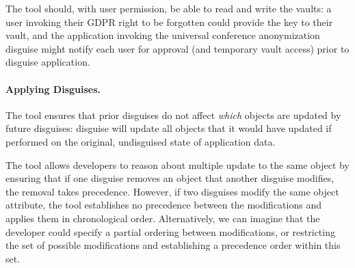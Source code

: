 The tool should, with user permission, be able to read and write the vaults: a user invoking their
GDPR right to be forgotten could provide the key to their vault, and the application invoking the
universal conference anonymization disguise might notify each user for approval (and temporary vault
access) prior to disguise application.  

\paragraph{Applying Disguises.}
The tool ensures that prior disguises do not affect \emph{which} objects are updated by future
disguises: disguise will update all objects that it would have updated if performed on the original,
undisguised state of application data. 

The tool allows developers to reason about multiple update to the same object by ensuring that 
if one disguise removes an object that another disguise modifies, the removal takes
precedence.
%
However, if two disguises modify the same object attribute, the tool
establishes no precedence between the modifications and applies them in chronological order.
Alternatively, we can imagine that the developer could specify a partial ordering between
modifications, or restricting the set of possible modifications and establishing a precedence order
within this set.

